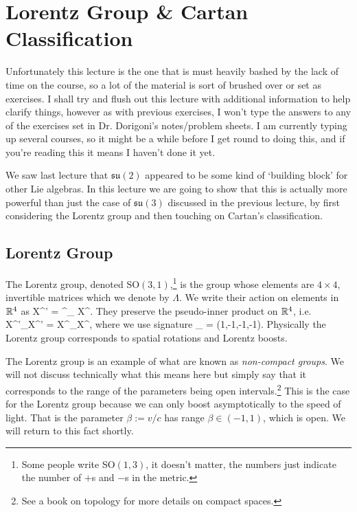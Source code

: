 \chapter{Lorentz Group \& Cartan Classification}

\br 
    Unfortunately this lecture is the one that is must heavily bashed by the lack of time on the course, so a lot of the material is sort of brushed over or set as exercises. I shall try and flush out this lecture with additional information to help clarify things, however as with previous exercises, I won't type the answers to any of the exercises set in Dr. Dorigoni's notes/problem sheets. I am currently typing up several courses, so it might be a while before I get round to doing this, and if you're reading this it means I haven't done it yet.
\er 

We saw last lecture that $\mathfrak{su}(2)$ appeared to be some kind of `building block' for other Lie algebras. In this lecture we are going to show that this is actually more powerful than just the case of $\mathfrak{su}(3)$ discussed in the previous lecture, by first considering the Lorentz group and then touching on Cartan's classification.

\section{Lorentz Group}

The Lorentz group, denoted SO$(3,1)$,\footnote{Some people write SO$(1,3)$, it doesn't matter, the numbers just indicate the number of $+$s and $-$s in the metric.} is the group whose elements are $4\times 4$, invertible matrices which we denote by $\Lambda$. We write their action on elements in $\mathbb{R}^4$ as
\bse 
    X^{'\mu} = {\Lambda^{\mu}}_{\nu} X^{\nu}.
\ese 
They preserve the pseudo-inner product on $\mathbb{R}^4$, i.e. 
\be
\label{eqn:X'etaX'=XetaX}
    X^{'\mu}\eta_{\mu\nu}X^{'\nu} = X^{\mu}\eta_{\mu\nu}X^{\nu},
\ee 
where we use signature
\bse 
    \eta_{\mu\nu} = (1,-1,-1,-1).
\ese 
Physically the Lorentz group corresponds to spatial rotations and Lorentz boosts.

\br 
\label{rem:NonCompactGroups}
    The Lorentz group is an example of what are known as \textit{non-compact groups}. We will not discuss technically what this means here but simply say that it corresponds to the range of the parameters being open intervals.\footnote{See a book on topology for more details on compact spaces.} This is the case for the Lorentz group because we can only boost asymptotically to the speed of light. That is the parameter $\beta := v/c$ has range $\beta\in(-1,1)$, which is open. We will return to this fact shortly.
\er 

